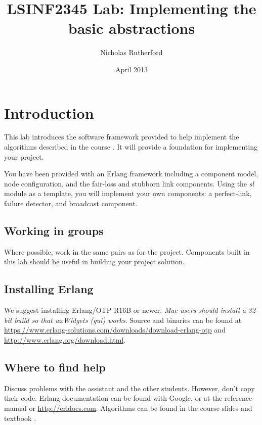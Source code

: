 \documentclass[a4paper]{article}
\title{LSINF2345 Lab: Implementing the basic abstractions}
\author{Nicholas Rutherford}
\date{April 2013}
\begin{document}
\ifpdf
{}
\else
{}
\fi

\maketitle


\section{Introduction}

This lab introduces the software framework provided to help
implement the algorithms described in the course \cite{cachin2011}.
It will provide a foundation for implementing your project.

You have been provided with an Erlang framework including a component model,
node configuration, and the fair-loss and stubborn link components. Using the
\emph{sl} module as a template, you will implement your own components: a
perfect-link, failure detector, and broadcast component.

\subsection{Working in groups} %
\label{sub:how_to_work}

Where possible, work in the same pairs as for the project. Components built in
this lab should be useful in building your project solution.


\subsection{Installing Erlang} %
\label{sub:installing_erlang}

We suggest installing Erlang/OTP R16B or newer. \emph{Mac users should install
a 32-bit build so that wxWidgets (gui) works}. Source and binaries can be found at
\url{https://www.erlang-solutions.com/downloads/download-erlang-otp} and
\url{http://www.erlang.org/download.html}.


\subsection{Where to find help} %
\label{sub:where_to_find_help}

Discuss problems with the assistant and the other students. However, don't
copy their code. Erlang documentation can be found with Google, or at the
reference
manual \cite{manual_stdlib}\cite{manual_expressions} or
\url{http://erldocs.com}. Algorithms can be found in the course slides and
textbook \cite{cachin2011}.
\end{document}
